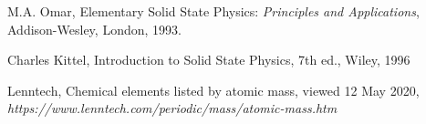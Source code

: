 \begin{thebibliography}{9}
    M.A. Omar, Elementary Solid State Physics:  
    \textit{Principles and Applications}, 
    Addison-Wesley, London, 1993.
    
    Charles Kittel, Introduction to Solid State Physics, 7th ed.,
    Wiley, 1996

    Lenntech, Chemical elements listed by atomic mass, viewed 12 May 2020,
    \textit{https://www.lenntech.com/periodic/mass/atomic-mass.htm}

\end{thebibliography}